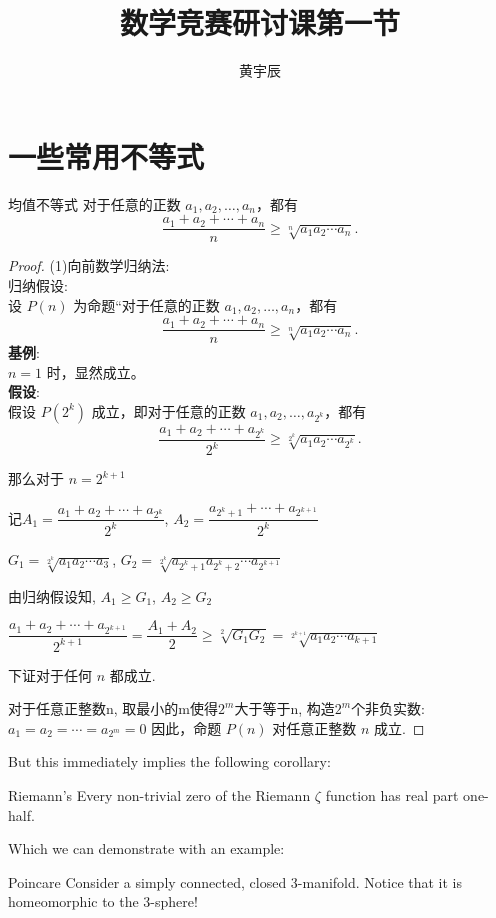 \documentclass{MathNoteCN}
\title{数学竞赛研讨课第一节}
\author{黄宇辰}
\begin{document}
	\maketitle
	\section{一些常用不等式}
	\begin{theorem}{均值不等式}{}
		对于任意的正数 $ a_1, a_2, \ldots, a_n $，都有
		\[\frac{a_1 + a_2 + \cdots + a_n}{n} \geq \sqrt[n]{a_1 a_2 \cdots a_n}.\]
	\end{theorem}
	\begin{proof}
		(1)向前数学归纳法: \\
		归纳假设: \\
		设 $ P(n) $ 为命题“对于任意的正数 $ a_1, a_2, \ldots, a_n $，都有
		\[\frac{a_1 + a_2 + \cdots + a_n}{n} \geq \sqrt[n]{a_1 a_2 \cdots a_n}.\]
		\textbf{基例}: \\
		$ n=1 $ 时，显然成立。\\
		\textbf{假设}: \\
		假设 $ P(2^{k}) $ 成立，即对于任意的正数 $ a_1, a_2, \ldots, a_{2^k} $，都有
		\[\frac{a_1 + a_2 + \cdots + a_{2^k}}{2^k} \geq \sqrt[2^k]{a_1 a_2 \cdots a_{2^k}}.\]

		那么对于 $ n=2^{k+1} $

        记$A_1=\dfrac{a_1+a_2+\cdots + a_{2^k}}{2^k}$, $A_2=\dfrac{a_{2^k+1}+\cdots + a_{2^{k+1}}}{2^k}$
        
        $G_1=\sqrt[2^k]{a_1a_2\cdots a_3}$, $G_2=\sqrt[2^k]{a_{2^k+1}a_{2^k+2}\cdots a_{2^{k+1}}}$
		
        由归纳假设知, $A_1 \geq G_1$, $A_2 \geq G_2$

        $\dfrac{a_1+a_2+\cdots + a_{2^{k+1}}}{2^{k+1}}=\dfrac{A_1+A_2}{2} \geq \sqrt[2]{G_1G_2}=\sqrt[2^{k+1}]{a_1a_2\cdots a_{k+1}}$

        下证对于任何 $n$ 都成立.

        对于任意正整数n, 取最小的m使得$2^m$大于等于n, 构造$2^m$个非负实数: 
        $a_1=a_2=\cdots =a_{2^m}=0$
        因此，命题 $ P(n) $ 对任意正整数 $ n $ 成立. 
	\end{proof}
	But this immediately implies the following corollary:
	\begin{corollary}{Riemann's}{}
		Every non-trivial zero of the Riemann $ \zeta $ function has real part one-half.
	\end{corollary}
	Which we can demonstrate with an example:
	\begin{example}{Poincare}{}
		Consider a simply connected, closed 3-manifold. Notice that it is homeomorphic to the 3-sphere!
	\end{example}
\end{document}
